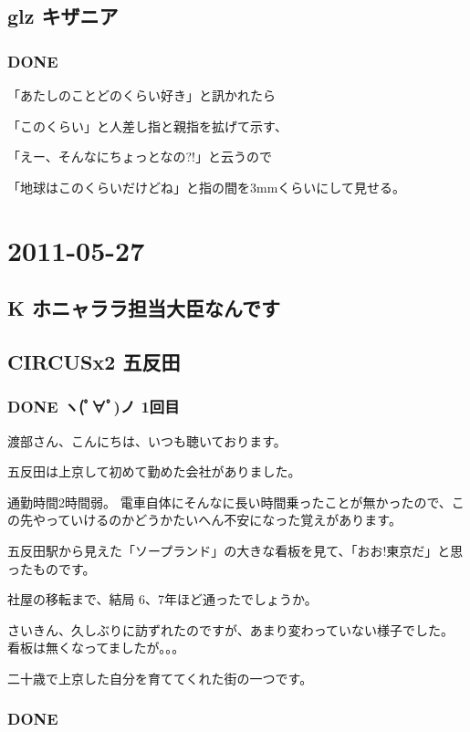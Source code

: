 \documentclass[11pt]{article}
\begin{document}
\subsection{glz キザニア}
\label{sec-115_1}
\subsubsection{\textbf{DONE}}
\label{sec-115_1_1}

「あたしのことどのくらい好き」と訊かれたら

「このくらい」と人差し指と親指を拡げて示す、

「えー、そんなにちょっとなの?!」と云うので

「地球はこのくらいだけどね」と指の間を3mmくらいにして見せる。
\section{2011-05-27}
\label{sec-116}
\subsection{K ホニャララ担当大臣なんです}
\label{sec-116_1}
\subsection{CIRCUSx2 五反田}
\label{sec-116_2}
\subsubsection{\textbf{DONE} ヽ(ﾟ∀ﾟ)ノ 1回目}
\label{sec-116_2_1}

渡部さん、こんにちは、いつも聴いております。

五反田は上京して初めて勤めた会社がありました。

通勤時間2時間弱。
電車自体にそんなに長い時間乗ったことが無かったので、この先やっていけるのかどうかたいへん不安になった覚えがあります。

五反田駅から見えた「ソープランド」の大きな看板を見て、「おお!東京だ」と思ったものです。

社屋の移転まで、結局 6、7年ほど通ったでしょうか。

さいきん、久しぶりに訪ずれたのですが、あまり変わっていない様子でした。
看板は無くなってましたが。。。

二十歳で上京した自分を育ててくれた街の一つです。
\subsubsection{\textbf{DONE}}
\label{sec-116_2_2}
\end{document}
